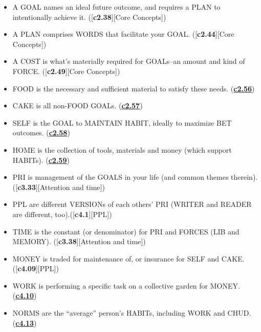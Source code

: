 \documentclass[
]{book}
\providecommand{\tightlist}{%
  \setlength{\itemsep}{0pt}\setlength{\parskip}{0pt}}
\begin{document}
\begin{itemize}
\tightlist
\item
  A GOAL names an ideal future outcome, and requires a PLAN to intentionally achieve it. ({[}\textbf{c2.38}{]}{[}Core Concepts{]})\\
\item
  A PLAN comprises WORDS that facilitate your GOAL. ({[}\textbf{c2.44}{]}{[}Core Concepts{]})\\
\item
  A COST is what's materially required for GOALs--an amount and kind of FORCE. ({[}\textbf{c2.49}{]}{[}Core Concepts{]})\\
\item
  FOOD is the necessary and sufficient material to satisfy these needs. (\protect\hyperlink{self-self}{\textbf{c2.56}})\\
\item
  CAKE is all non-FOOD GOALs. (\protect\hyperlink{self-self}{\textbf{c2.57}})\\
\item
  SELF is the GOAL to MAINTAIN HABIT, ideally to maximize BET outcomes. (\protect\hyperlink{self-self}{\textbf{c2.58}})\\
\item
  HOME is the collection of tools, materials and money (which support HABITs). (\protect\hyperlink{home}{\textbf{c2.59}})\\
\item
  PRI is management of the GOALS in your life (and common themes therein). ({[}\textbf{c3.33}{]}{[}Attention and time{]})\\
\item
  PPL are different VERSIONs of each others' PRI (WRITER and READER are different, too).({[}\textbf{c4.1}{]}{[}PPL{]})\\
\item
  TIME is the constant (or denominator) for PRI and FORCES (LIB and MEMORY). ({[}\textbf{c3.38}{]}{[}Attention and time{]})\\
\item
  MONEY is traded for maintenance of, or insurance for SELF and CAKE. ({[}\textbf{c4.09}{]}{[}PPL{]})\\
\item
  WORK is performing a specific task on a collective garden for MONEY. (\protect\hyperlink{work}{\textbf{c4.10}})\\
\item
  NORMS are the ``average'' person's HABITs, including WORK and CHUD. (\protect\hyperlink{work}{\textbf{c4.13}})\\

\end{itemize}
\end{document}
